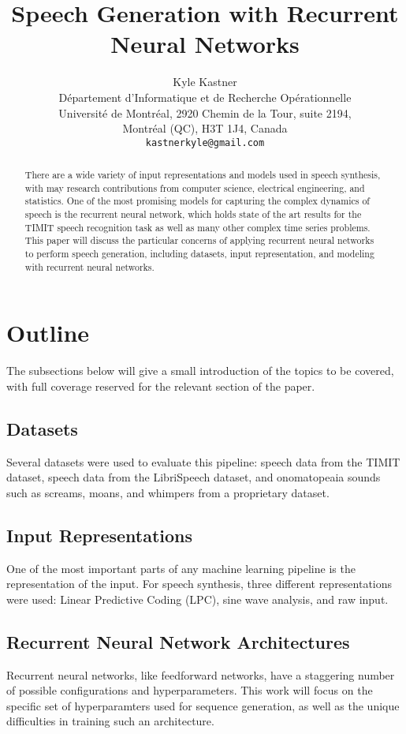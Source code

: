 \documentclass{article} %
\title{Speech Generation with Recurrent Neural Networks}
\author{
Kyle Kastner\\
Département d’Informatique et de Recherche Opérationnelle\\
Université de Montréal, 2920 Chemin de la Tour, suite 2194,\\
Montréal (QC), H3T 1J4, Canada\\
\texttt{kastnerkyle@gmail.com} \\
}
\begin{document}
\maketitle

\begin{abstract}
There are a wide variety of input 
representations and models used in speech
synthesis, with may research contributions from computer science, electrical
engineering, and statistics. One of the most promising models for capturing the
complex dynamics of speech is the recurrent neural network,
which holds state of the art results for the TIMIT speech recognition
task as well as many other complex time series problems. This paper will
discuss the particular concerns of applying recurrent neural networks to
perform speech generation, including datasets,
input representation, and modeling with recurrent neural networks.
\end{abstract}

\section{Outline}
The subsections below will
give a small introduction of the topics to be covered, with full coverage
reserved for the relevant section of the paper.

\subsection{Datasets}
Several datasets were used to evaluate this pipeline: speech data from the
TIMIT dataset, speech data from the LibriSpeech dataset, and onomatopeaia
sounds such as screams, moans, and whimpers from a proprietary dataset.

\subsection{Input Representations}
One of the most important parts of any machine learning pipeline is the
representation of the input. For speech synthesis, three different
representations were used: Linear Predictive Coding (LPC), sine wave
analysis, and raw input. 

\subsection{Recurrent Neural Network Architectures}
Recurrent neural networks, like feedforward networks, have a staggering
number of possible configurations and hyperparameters. This work will focus on the
specific set of hyperparamters used for sequence generation,
as well as the unique difficulties in training such an architecture.
\end{document}
